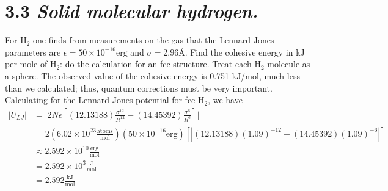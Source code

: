 \documentclass{article}
\begin{document}
\section*{3.3 \textit{Solid molecular hydrogen.}}
For $\text{H}_2$ one finds from measurements on the gas that the Lennard-Jones parameters are $\epsilon = 50 \times 10^{-16} \text{erg}$ and $\sigma = 2.96 \text{\AA}$. Find the cohesive energy in kJ per mole of $\text{H}_2$: do the calculation for an fcc structure. Treat each $\text{H}_2$ molecule as a sphere. The observed value of the cohesive energy is 0.751 kJ/mol, much less than we calculated; thus, quantum corrections must be very important.
\newline\newline
Calculating for the Lennard-Jones potential for fcc $\text{H}_2$, we have
\begin{align*}
    |U_{LJ}| &= \bigg|2N\epsilon \left[(12.13188)\frac{\sigma^{12}}{R^{12}} - (14.45392)\frac{\sigma^6}{R^6}\right]\bigg| \\
    &= 2\left(6.02 \times 10^{23} \frac{\text{atoms}}{\text{mol}}\right)(50\times 10^{-16} \text{erg})\left[|(12.13188)(1.09)^{-12} - (14.45392)(1.09)^{-6}|\right] \\
    &\approx 2.592\times 10^{10} \frac{\text{erg}}{\text{mol}} \\
    &= 2.592 \times 10^3 \frac{\text{J}}{\text{mol}} \\
    &= 2.592 \frac{\text{kJ}}{\text{mol}} \\
\end{align*}
\end{document}
